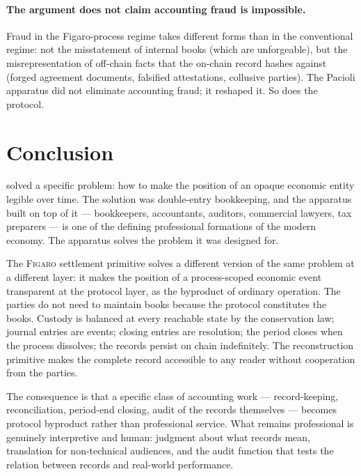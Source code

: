 \documentclass[11pt,a4paper]{article}
\theoremstyle{definition}
\theoremstyle{remark}
\newcommand{\figaro}{\textsc{Figaro}}
\begin{document}
\paragraph{The argument does not claim accounting fraud is
impossible.}
Fraud in the Figaro-process regime takes different forms
than in the conventional regime: not the misstatement of
internal books (which are unforgeable), but the
misrepresentation of off-chain facts that the on-chain
record hashes against (forged agreement documents, falsified
attestations, collusive parties). The Pacioli apparatus did
not eliminate accounting fraud; it reshaped it. So does the
protocol.

\section{Conclusion}
\label{sec:conclusion}

\citet{pacioli1494summa} solved a specific problem: how to
make the position of an opaque economic entity legible over
time. The solution was double-entry bookkeeping, and the
apparatus built on top of it --- bookkeepers, accountants,
auditors, commercial lawyers, tax preparers --- is one of
the defining professional formations of the modern economy.
The apparatus solves the problem it was designed for.

The \figaro{} settlement primitive solves a different
version of the same problem at a different layer: it makes
the position of a process-scoped economic event transparent
at the protocol layer, as the byproduct of ordinary
operation. The parties do not need to maintain books
because the protocol constitutes the books. Custody is
balanced at every reachable state by the conservation law;
journal entries are events; closing entries are resolution;
the period closes when the process dissolves; the records
persist on chain indefinitely. The reconstruction primitive
makes the complete record accessible to any reader without
cooperation from the parties.

The consequence is that a specific class of accounting work
--- record-keeping, reconciliation, period-end closing,
audit of the records themselves --- becomes protocol
byproduct rather than professional service. What remains
professional is genuinely interpretive and human:
judgment about what records mean, translation for
non-technical audiences, and the audit function that tests
the relation between records and real-world performance.
\end{document}
